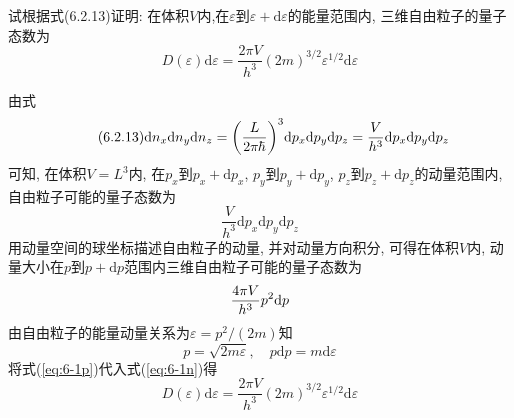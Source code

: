 \begin{problem}[6.1]
试根据式(6.2.13)证明: 在体积$V$内,在$\varepsilon$到$\varepsilon + \mathrm{d} \varepsilon$的能量范围内, 三维自由粒子的量子态数为
\[
D(\varepsilon) \mathrm{d} \varepsilon = \frac{2\pi V}{h^3} (2m)^{3/2}\varepsilon^{1/2} \mathrm{d} \varepsilon
\]
\end{problem}
\begin{solution}
由式
\begin{equation}\tag{6.2.13}
\d n_x\d n_y\d n_z = \bigg(\frac{L}{2\pi\hbar}\bigg)^3\d p_x \d p_y \d p_z 
= \frac{V}{h^3}\mathrm{d}p_x\mathrm{d}p_y\mathrm{d}p_z
\end{equation}
可知, 在体积$V=L^3$内, 在$p_x$到$p_x+\mathrm{d}p_x$, $p_y$到$p_y+\mathrm{d}p_y$, $p_z$到$p_z+\mathrm{d}p_z$的动量范围内, 自由粒子可能的量子态数为
\[
\frac{V}{h^3}\mathrm{d}p_x\mathrm{d}p_y\mathrm{d}p_z
\]
用动量空间的球坐标描述自由粒子的动量, 并对动量方向积分, 可得在体积$V$内, 动量大小在$p$到$p+\mathrm{d}p$范围内三维自由粒子可能的量子态数为
\begin{equation}\label{eq:6-1n}
\frac{4\pi V}{h^3} p^2\mathrm{d} p
\end{equation}
由自由粒子的能量动量关系为$\varepsilon=p^2/(2m)$知
\begin{equation}\label{eq:6-1p}
p = \sqrt{2m\varepsilon},\quad p\mathrm{d}p = m\mathrm{d}\varepsilon
\end{equation}
将式(\ref{eq:6-1p})代入式(\ref{eq:6-1n})得
\[
D(\varepsilon) \mathrm{d} \varepsilon = \frac{2\pi V}{h^3} (2m)^{3/2}\varepsilon^{1/2} \mathrm{d} \varepsilon
\]
\end{solution}


